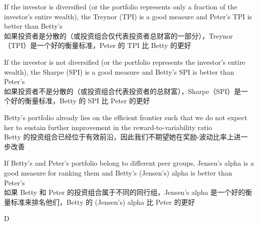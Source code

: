\documentclass{article}
\begin{document}
\begin{choices}
    \item If the investor is diversified (or the portfolio represents only a fraction of the investor's entire wealth), the Treynor (TPI) is a good measure and Peter's TPI is better than Betty's
    \\如果投资者是分散的（或投资组合仅代表投资者总财富的一部分），Treynor（TPI）是一个好的衡量标准，Peter 的 TPI 比 Betty 的更好
    \item If the investor is not diversified (or the portfolio represents the investor's entire wealth), the Sharpe (SPI) is a good measure and Betty's SPI is better than Peter's
    \\如果投资者不是分散的（或投资组合代表投资者的总财富），Sharpe（SPI）是一个好的衡量标准，Betty 的 SPI 比 Peter 的更好
    \item Betty's portfolio already lies on the efficient frontier such that we do not expect her to sustain further improvement in the reward-to-variability ratio
    \\Betty 的投资组合已经位于有效前沿，因此我们不期望她在奖励-波动比率上进一步改善
    \item If Betty's and Peter's portfolio belong to different peer groups, Jensen's alpha is a good measure for ranking them and Betty's (Jensen's) alpha is better than Peter's
    \\如果 Betty 和 Peter 的投资组合属于不同的同行组，Jensen's alpha 是一个好的衡量标准来排名他们，Betty 的 (Jensen's) alpha 比 Peter 的更好
\end{choices}

\begin{correctanswer}
    D
\end{correctanswer}
\end{document}
